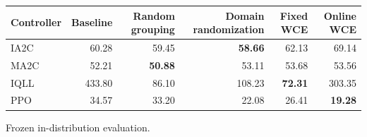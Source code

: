 \begin{tabular}{lrrrrr}
\hline
Controller & Baseline & Random grouping & Domain randomization & Fixed WCE & Online WCE \\
\hline
IA2C & 60.28 & 59.45 & \textbf{58.66} & 62.13 & 69.14 \\
MA2C & 52.21 & \textbf{50.88} & 53.11 & 53.68 & 53.56 \\
IQLL & 433.80 & 86.10 & 108.23 & \textbf{72.31} & 303.35 \\
PPO & 34.57 & 33.20 & 22.08 & 26.41 & \textbf{19.28} \\
\hline
\end{tabular}
Frozen in-distribution evaluation.
